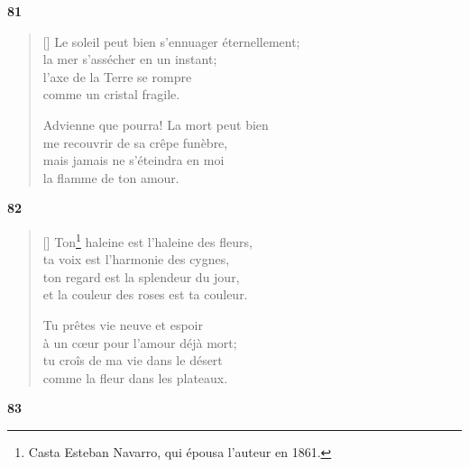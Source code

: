 \documentclass[a4paper,12pt]{book}
\begin{document}
\bigskip

\begin{center}
  \textbf{81}
\end{center}

\settowidth{\versewidth}{Le soleil peut bien s'ennuager éternellement;}


\begin{verse}[\versewidth]
  Le soleil peut bien s'ennuager éternellement; \\
  la mer s'assécher en un instant; \\
  l'axe de la Terre se rompre \\
  comme un cristal fragile.

  Advienne que pourra! La mort peut bien \\
  me recouvrir de sa crêpe funèbre, \\
  mais jamais ne s'éteindra en moi \\
  la flamme de ton amour.
\end{verse}

\bigskip

\begin{center}
  \textbf{82}
\end{center}

\settowidth{\versewidth}{et la couleur des roses est ta couleur.}


\begin{verse}[\versewidth]
  Ton\footnote{Casta Esteban Navarro, qui épousa
  l'auteur en 1861.} haleine est l'haleine des fleurs, \\
  ta voix est l'harmonie des cygnes, \\
  ton regard est la splendeur du jour, \\
  et la couleur des roses est ta couleur.

  Tu prêtes vie neuve et espoir \\
  à un cœur pour l'amour déjà mort; \\
  tu croîs de ma vie dans le désert \\
  comme la fleur dans les plateaux.
\end{verse}

\bigskip

\begin{center}
  \textbf{83}
\end{center}
\end{document}
